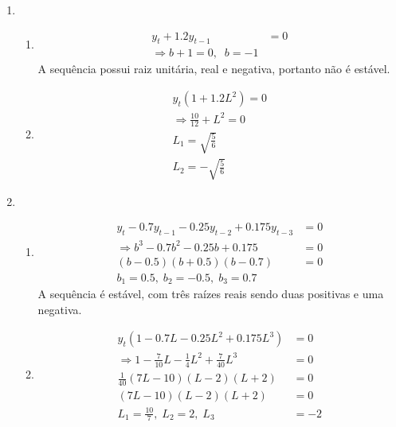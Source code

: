 \begin{enumerate}
\begin{enumerate}
\begin{enumerate}
	\end{enumerate}
		
		\item %
		
		\begin{enumerate}
			\item %
		
		\begin{align*}
			y_t+1.2y_{t-1}&=0\\
			\Rightarrow b+1=0,\;\;b=-1
		\end{align*}
		A sequência possui raiz unitária, real e negativa, portanto não é estável.
		
		\item %
		
		\begin{align*}
			y_t(1+1.2L^2)=0\\
			\Rightarrow \frac{10}{12}+L^2=0\\
			L_1=\sqrt{\frac{5}{6}}\\
			L_2=-\sqrt{\frac{5}{6}}
		\end{align*}
		
	\end{enumerate}
		
		\item %
		
		\begin{enumerate}
			\item %
		
		
		\begin{align*}
			y_t-0.7y_{t-1}-0.25y_{t-2}+0.175y_{t-3}&=0\\
			\Rightarrow  b^3-0.7b^2-0.25b+0.175&=0\\
			(b-0.5)(b+0.5)(b-0.7)&=0\\
			b_1=0.5,\;b_2=-0.5,\;b_3=0.7
		\end{align*}
		A sequência é estável, com três raízes reais sendo duas positivas e uma negativa.
		
		\item %
		
		\begin{align*}
			y_t(1-0.7L-0.25L^2+0.175L^3)&=0\\
			\Rightarrow 
		1-\frac{7}{10}L-\frac{1}{4}L^2+\frac{7}{40}L^3&=0\\
		\frac{1}{40}(7L-10)(L-2)(L+2)&=0\\
		(7L-10)(L-2)(L+2)&=0\\
		L_1=\frac{10}{7},\;L_2=2,\;L_3&=-2		
		\end{align*}
		

\end{enumerate}
\end{enumerate}
\end{enumerate}
